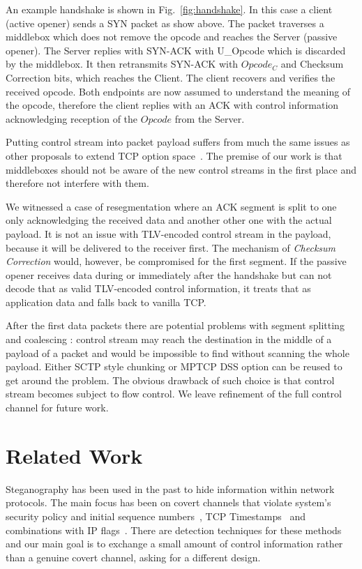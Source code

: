 \documentclass{sig-alternate-10pt}
\begin{document}
An example handshake is shown in Fig.~\ref{fig:handshake}. In this case a client (active opener) sends a SYN packet as show above. The packet traverses a middlebox which does not remove the opcode and reaches the Server (passive opener). The Server replies with SYN-ACK with U\_Opcode which is discarded by the middlebox. It then retransmits SYN-ACK with $Opcode_C$ and Checksum Correction bits, which reaches the Client. The client recovers and verifies the received opcode. Both endpoints are now assumed to understand the meaning of the opcode, therefore the client replies with an ACK with control information acknowledging reception of the $Opcode$ from the Server.

Putting control stream into packet payload suffers from much the same issues as other proposals to extend TCP option space~\cite{Ramaiah:2012wa}. The premise of our work is that middleboxes should not be aware of the new control streams in the first place and therefore not interfere with them.

We witnessed a case of resegmentation where an ACK segment is split to one only acknowledging the received data and another other one with the actual payload. It is not an issue with TLV-encoded control stream in the payload, because it will be delivered to the receiver first. The mechanism of \emph{Checksum Correction} would, however, be compromised for the first segment. If the passive opener receives data during or immediately after the handshake but can not decode that as valid TLV-encoded control information, it treats that as application data and falls back to vanilla TCP.

After the first data packets there are potential problems with segment splitting and coalescing : control stream may reach the destination in the middle of a payload of a packet and would be impossible to find without scanning the whole payload. Either SCTP style chunking or MPTCP DSS option can be reused to get around the problem. The obvious drawback of such choice is that control stream becomes subject to flow control. We leave refinement of the full control channel for future work.

\section{Related Work}
\label{sec:related}

Steganography has been used in the past to hide information within network protocols. The main focus has been on covert channels that violate system's security policy and initial sequence numbers~\cite{Rowland:1997vq}, TCP Timestamps~\cite{Giffin:2002wh} and combinations with IP flags~\cite{Murdoch:2005fz}. There are detection techniques for these methods and our main goal is to exchange a small amount of control information rather than a genuine covert channel, asking for a different design.
\end{document}
